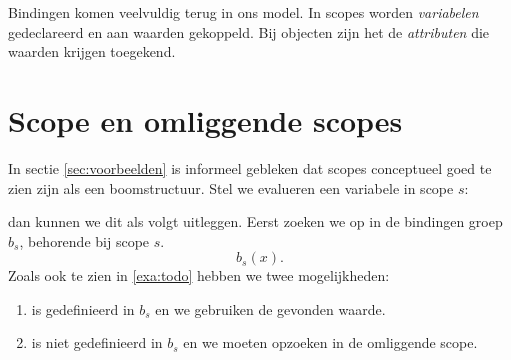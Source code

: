 Bindingen komen veelvuldig terug in ons model. In scopes worden \emph{variabelen} gedeclareerd en aan waarden gekoppeld. Bij objecten zijn het de \emph{attributen} die waarden krijgen toegekend.

\section{Scope en omliggende scopes}

In sectie \ref{sec:voorbeelden} is informeel gebleken dat scopes conceptueel goed te zien zijn als een boomstructuur. Stel we evalueren een variabele  in scope $s$:

\newCodeFragment
{}

dan kunnen we dit als volgt uitleggen. Eerst zoeken we  op in de bindingen groep $b_s$, behorende bij scope $s$.
\begin{equation*}
  b_s(x).
\end{equation*}
Zoals ook te zien in \ref{exa:todo} hebben we twee mogelijkheden:


\begin{enumerate}
  \item {} is gedefinieerd in $b_s$ en we gebruiken de gevonden waarde.
  \item {} is niet gedefinieerd in $b_s$ en we moeten  opzoeken in de omliggende scope.
\end{enumerate}

